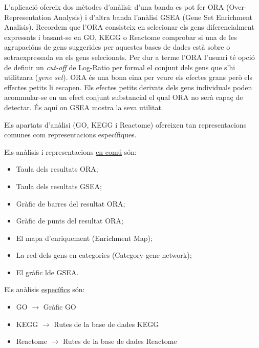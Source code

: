 \documentclass[]{article}
\begin{document}
L'aplicació ofereix dos mètodes d'anàlisi: d'una banda es pot  fer ORA (Over-Representation Analysis) i d'altra banda l'anàlisi GSEA (Gene Set Enrichment Analisis). Recordem que l'ORA consisteix en selecionar els gens diferencialment expressats i basant-se en GO, KEGG o Reactome comprobar si una de les agrupacións de gens suggerides per aquestes bases de dades està sobre o sotraexpressada en els gens selecionats. Per dur a terme l'ORA l'usuari té opció de definir un \textit{cut-off} de Log-Ratio per formal el conjunt dels gens que s'hi utilitzara (\textit{gene set}). ORA és una bona eina per veure els efectes grans però els effectes petits li escapen.  Els efectes petits derivats dels gens individuals poden acommular-se en un efect conjunt substancial el qual ORA no serà capaç de detectar. És aquí on GSEA mostra la seva utilitat. 

Els apartats d'anàlisi (GO, KEGG i Reactome) ofereixen tan representacions comunes com representacions específiques. 

Els anàlisis i representacions  \underline{en comú} són:

\begin{itemize}
\item Taula dels resultats ORA;
\item Taula dels resultats GSEA;
\item Gràfic de barres del resultat ORA;
\item Gràfic de punts del resultat ORA;
\item El mapa d'enriquement (Enrichment Map);
\item La red dels gens en categories (Category-gene-network);
\item El gràfic lde GSEA.
\end{itemize} 

Els anàlisis \underline{específics} són:

\begin{itemize}
\item GO $\rightarrow$ Gràfic GO 
\item KEGG $\rightarrow$ Rutes de la base de dades KEGG
\item Reactome $\rightarrow$ Rutes de la base de dades Reactome
\end{itemize}
\end{document}
